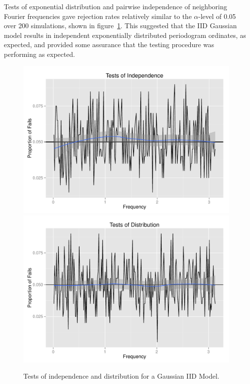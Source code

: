 \documentclass{article}\usepackage{graphicx, color}
\newenvironment{knitrout}{}{} %
\theoremstyle{plain}
\begin{document}
Tests of exponential distribution and pairwise independence of neighboring Fourier frequencies gave rejection rates relatively similar to the $\alpha$-level of 0.05 over 200 simulations, shown in figure~\ref{fig:tests-iid}. This suggested that the IID Gaussian model results in independent exponentially distributed periodogram ordinates, as expected, and provided some assurance that the testing procedure was performing as expected.

\begin{knitrout}
\color{fgcolor}\begin{figure}[h]

\includegraphics[width=.49\textwidth]{figure/tests-iid1} 
\includegraphics[width=.49\textwidth]{figure/tests-iid2} \caption[Tests of independence and distribution for a Gaussian IID Model]{Tests of independence and distribution for a Gaussian IID Model.\label{fig:tests-iid}}
\end{figure}


\end{knitrout}
\end{document}
